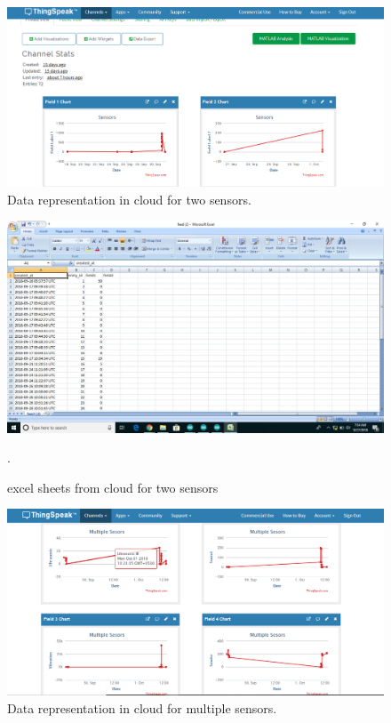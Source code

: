 \begin{figure}[h]
\centerline{\includegraphics[width=4.7in]{01}}
\caption{Data representation in cloud for two sensors.}
\end{figure}
\begin{figure}[h]
\centerline{\includegraphics[width=6.7in]{xfortwo}}
\caption{excel sheets from cloud for two sensors}.
\end{figure}
\begin{figure}[h]
\centerline{\includegraphics[width=6.7in]{22}}
\caption{Data representation in cloud for multiple sensors.}
\end{figure}
\newpage

